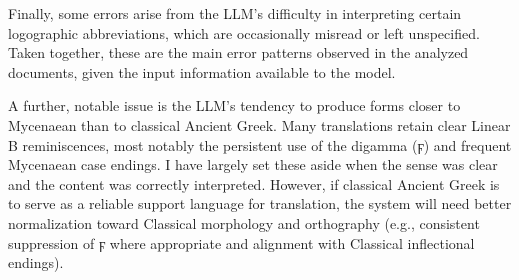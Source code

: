Finally, some errors arise from the LLM's difficulty in interpreting certain logographic abbreviations, which are occasionally misread or left unspecified.
Taken together, these are the main error patterns observed in the analyzed documents, given the input information available to the model.

A further, notable issue is the LLM's tendency to produce forms closer to Mycenaean than to classical Ancient Greek.
Many translations retain clear Linear B reminiscences, most notably the persistent use of the digamma (\textgreek{ϝ}) and frequent Mycenaean case endings.
I have largely set these aside when the sense was clear and the content was correctly interpreted.
However, if classical Ancient Greek is to serve as a reliable support language for translation, the system will need better normalization toward Classical morphology and orthography (e.g., consistent suppression of \textgreek{ϝ} where appropriate and alignment with Classical inflectional endings).

